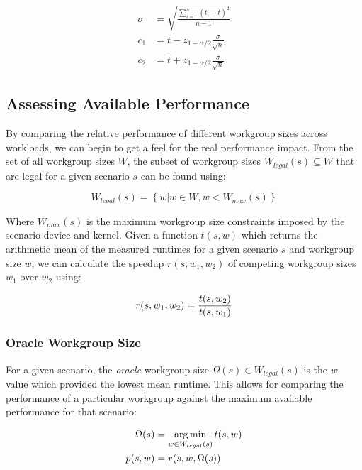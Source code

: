 \begin{align}
\sigma &= \sqrt{\frac{\sum_{i=1}^{n}(t_i - \bar{t})^2}{n - 1}}\\
c_1 &= \bar{t} - z_{1-\alpha/2}\frac{\sigma}{\sqrt{n}}\\
c_2 &= \bar{t} + z_{1-\alpha/2}\frac{\sigma}{\sqrt{n}}
\end{align}



\subsection{Assessing Available Performance}

By comparing the relative performance of different workgroup sizes
across workloads, we can begin to get a feel for the real performance
impact. From the set of all workgroup sizes $W$, the subset of
workgroup sizes $W_{legal}(s) \subseteq W$ that are legal for a given
scenario $s$ can be found using:

\begin{equation}
W_{legal}(s) = \left\{w | w \in W, w < W_{max}(s) \right\}
\end{equation}

Where $W_{max}(s)$ is the maximum workgroup size constraints imposed
by the scenario device and kernel. Given a function $t(s,w)$ which
returns the arithmetic mean of the measured runtimes for a given
scenario $s$ and workgroup size $w$, we can calculate the speedup
$r(s, w_1, w_2)$ of competing workgroup sizes $w_1$ over $w_2$ using:

\begin{equation}
  r(s, w_1, w_2) = \frac{t(s,w_2)}{t(s,w_1)}\\
\end{equation}


\subsubsection{Oracle Workgroup Size}

For a given scenario, the \emph{oracle} workgroup size
$\Omega(s) \in W_{legal}(s)$ is the $w$ value which provided the
lowest mean runtime. This allows for comparing the performance of a
particular workgroup against the maximum available performance for
that scenario:

\begin{align}
  \Omega(s) &= \operatorname*{arg\,min}_{w \in W_{legal}(s)} t(s,w)\\
  p(s,w) &= r(s, w, \Omega(s))
\end{align}

